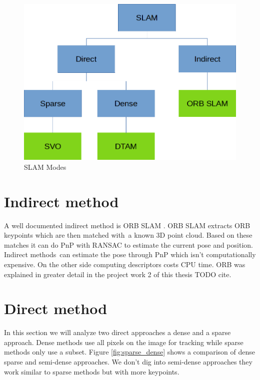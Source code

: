 \documentclass[11pt,a4paper,titlepage,oneside]{report}
\begin{document}
\begin{figure}[H]
	\includegraphics[width=1.0\textwidth]{img/slam_modes.png}
	\caption{SLAM Modes}\label{fig:slammodes}
\end{figure}


\section{Indirect method}

A well documented indirect method is ORB SLAM \cite{orbslam}. ORB SLAM extracts ORB keypoints which are then matched with a known 3D point cloud. Based on these matches it can do PnP with RANSAC \cite{ransac} to estimate the current pose and position. Indirect methods can estimate the pose through PnP which isn’t computationally expensive. On the other side computing descriptors costs CPU time. ORB was explained in greater detail in the project work 2 of this thesis TODO cite.

\section{Direct method}

In this section we will analyze two direct approaches a dense and a sparse approach. Dense methods use all pixels on the image for tracking while sparse methods only use a subset. Figure \ref{fig:sparse_dense} shows a comparison of dense sparse and semi-dense approaches. We don't dig into semi-dense approaches they work similar to sparse methods but with more keypoints.
\end{document}
